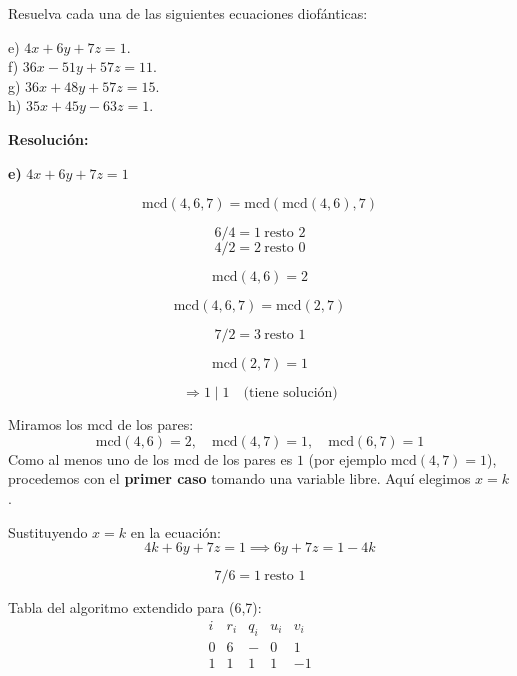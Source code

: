 \documentclass[a4paper,12pt]{article}
\begin{document}
\begin{ejercicio}[title=Ejercicio 9]
Resuelva cada una de las siguientes ecuaciones diofánticas:

e) $4x + 6y + 7z = 1$.\\
f) $36x - 51y + 57z = 11$.\\
g) $36x + 48y + 57z = 15$.\\
h) $35x + 45y - 63z = 1$.

\tcblower
\textbf{Resolución:}

\textbf{e) } $4x + 6y + 7z = 1$

\vspace{0.5em}

\[
\text{mcd}(4,6,7) = \text{mcd}(\text{mcd}(4,6),7)
\]

\[
6 / 4 = 1 \ \text{resto } \boxed{2}
\]
\[
4 / 2 = 2 \ \text{resto } 0
\]

\[
\text{mcd}(4,6) = \boxed{2}
\]

\[
\text{mcd}(4,6,7) = \text{mcd}(2,7)
\]

\[
7 / 2 = 3 \ \text{resto } \boxed{1}
\]

\[
\text{mcd}(2,7) = \boxed{1}
\]

\[
\Rightarrow 1 \mid 1 \quad\text{(tiene solución)}
\]

\vspace{0.5em}

Miramos los mcd de los pares:
\[
\text{mcd}(4,6)=2,\quad \text{mcd}(4,7)=1,\quad \text{mcd}(6,7)=1
\]
Como al menos uno de los mcd de los pares es $1$ (por ejemplo $\text{mcd}(4,7)=1$), procedemos con el \textbf{primer caso} tomando una variable libre. Aquí elegimos $x=k$.

Sustituyendo $x=k$ en la ecuación:
\[
4k + 6y + 7z = 1 \implies 6y + 7z = 1 - 4k
\]

\[
7 / 6 = 1 \ \text{resto } \boxed{1}
\]

Tabla del algoritmo extendido para (6,7):
\[
\begin{array}{c|c|c|c|c}
i & r_i & q_i & u_i & v_i\\
\hline
0 & 6 & - & 0 & 1\\
1 & \boxed{1} & 1 & 1 & -1
\end{array}
\]

\end{ejercicio}
\end{document}
